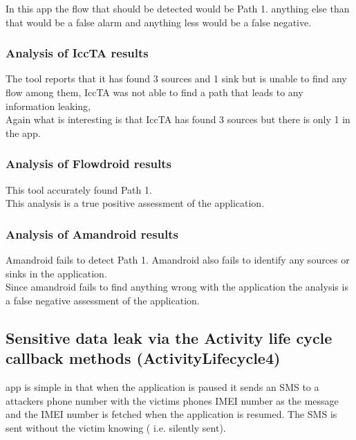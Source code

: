 \documentclass[journal]{IEEEtran}
\begin{document}
In this app the flow that should be detected would be Path 1. anything else than that would be a false alarm and anything less would be a false negative. \\

  

\subsubsection{Analysis of IccTA results}
The tool reports that it has found 3 sources and 1 sink but is unable to find any flow among them, IccTA was not able to find a path that leads to any information leaking,\\
Again what is interesting is that IccTA has found 3 sources but there is only 1 in the app.

\subsubsection{Analysis of Flowdroid results}
This tool accurately found Path 1.\\
This analysis is a true positive assessment of the application.\\

\subsubsection{Analysis of Amandroid results}
Amandroid fails to detect Path 1. Amandroid also fails to identify any sources or sinks in the  application.\\ Since amandroid fails to find anything wrong with the application the analysis is a false negative assessment of the application.

\subsection{Sensitive data leak via the Activity life cycle  callback methods (ActivityLifecycle4)}
% 
% 
% 
% 
 app is simple in that when the application is paused it sends an SMS to a attackers phone number with the victims phones IMEI number as the message and the IMEI number is fetched when the application is resumed. The SMS is sent without the victim knowing ( i.e. silently sent).\\
\end{document}
